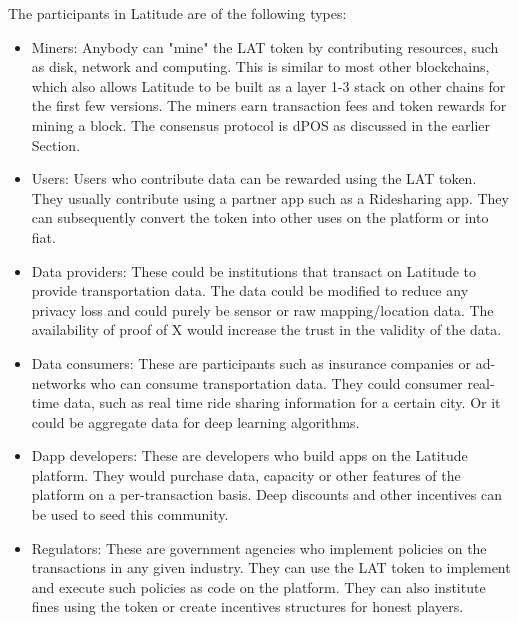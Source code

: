 The participants in Latitude are of the following types:
\begin{itemize}
    \item Miners: Anybody can "mine" the LAT token by contributing resources, such as disk, network and computing. This
        is similar to most other blockchains, which also allows Latitude to be built as a layer 1-3 stack on other
        chains for the first few versions. The miners earn transaction fees and token rewards for mining a block. The
        consensus protocol is dPOS as discussed in the earlier Section.
    \item Users: Users who contribute data can be rewarded using the LAT token. They usually contribute using a partner
        app such as a Ridesharing app. They can subsequently convert the token into other uses on the platform or into
        fiat.
    \item Data providers: These could be institutions that transact on Latitude to provide transportation data. The data
        could be modified to reduce any privacy loss and could purely be sensor or raw mapping/location data. The
        availability of proof of X would increase the trust in the validity of the data.
    \item Data consumers: These are participants such as insurance companies or ad-networks who can consume
        transportation data. They could consumer real-time data, such as real time ride sharing information for a
        certain city. Or it could be aggregate data for deep learning algorithms.
    \item Dapp developers: These are developers who build apps on the Latitude platform. They would purchase data,
        capacity or other features of the platform on a per-transaction basis. Deep discounts and other incentives can
        be used to seed this community.
    \item Regulators: These are government agencies who implement policies on the transactions in any given industry.
        They can use the LAT token to implement and execute such policies as code on the platform. They can also
        institute fines using the token or create incentives structures for honest players.
\end{itemize}

